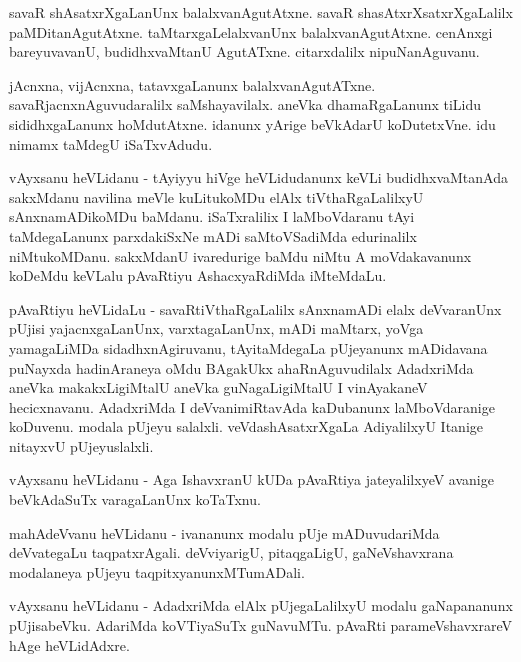\documentclass{article}
\begin{document}
\begin{mng}%
savaR shAsatxrXgaLanUnx balalxvanAgutAtxne. savaR 
shasAtxrXsatxrXgaLalilx paMDitanAgutAtxne. taMtarxgaLelalxvanUnx 
balalxvanAgutAtxne. cenAnxgi bareyuvavanU, budidhxvaMtanU AgutATxne. 
citarxdalilx nipuNanAguvanu.
\end{mng}

\begin{mng}%
jAcnxna, vijAcnxna, tatavxgaLanunx balalxvanAgutATxne. 
savaRjacnxnAguvudaralilx saMshayavilalx. aneVka dhamaRgaLanunx tiLidu 
sididhxgaLanunx hoMdutAtxne. idanunx yArige beVkAdarU koDutetxVne. idu 
nimamx taMdegU iSaTxvAdudu.
\end{mng}

\begin{mng}%
vAyxsanu heVLidanu - tAyiyyu hiVge heVLidudanunx keVLi 
budidhxvaMtanAda sakxMdanu navilina meVle kuLitukoMDu elAlx 
tiVthaRgaLalilxyU sAnxnamADikoMDu baMdanu. iSaTxralilix I laMboVdaranu 
tAyi taMdegaLanunx parxdakiSxNe mADi saMtoVSadiMda edurinalilx 
niMtukoMDanu. sakxMdanU ivaredurige baMdu niMtu A moVdakavanunx 
koDeMdu keVLalu pAvaRtiyu AshacxyaRdiMda iMteMdaLu.
\end{mng}

\begin{mng}%
pAvaRtiyu heVLidaLu - savaRtiVthaRgaLalilx sAnxnamADi elalx 
deVvaranUnx pUjisi yajacnxgaLanUnx, varxtagaLanUnx, mADi maMtarx, 
yoVga yamagaLiMDa sidadhxnAgiruvanu, tAyitaMdegaLa pUjeyanunx 
mADidavana puNayxda hadinAraneya oMdu BAgakUkx ahaRnAguvudilalx 
AdadxriMda aneVka makakxLigiMtalU aneVka guNagaLigiMtalU I vinAyakaneV 
hecicxnavanu. AdadxriMda I deVvanimiRtavAda kaDubanunx laMboVdaranige 
koDuvenu. modala pUjeyu salalxli. veVdashAsatxrXgaLa AdiyalilxyU 
Itanige nitayxvU pUjeyuslalxli.
\end{mng}

\begin{mng}%
vAyxsanu heVLidanu - Aga IshavxranU kUDa pAvaRtiya jateyalilxyeV 
avanige beVkAdaSuTx varagaLanUnx koTaTxnu.
\end{mng}

\begin{mng}%
mahAdeVvanu heVLidanu - ivananunx modalu pUje mADuvudariMda 
deVvategaLu taqpatxrAgali. deVviyarigU, pitaqgaLigU, gaNeVshavxrana 
modalaneya pUjeyu taqpitxyanunxMTumADali.
\end{mng}

\begin{mng}%
vAyxsanu heVLidanu - AdadxriMda elAlx pUjegaLalilxyU modalu 
gaNapananunx pUjisabeVku. AdariMda koVTiyaSuTx guNavuMTu. pAvaRti 
parameVshavxrareV hAge heVLidAdxre.
\end{mng}
\end{document}
